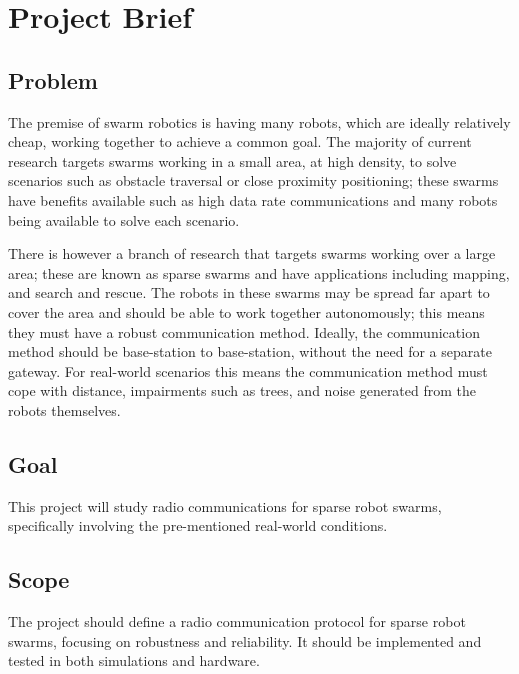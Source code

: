 \chapter{Project Brief}\label{sec:project_brief}
\section*{Problem}
The premise of swarm robotics is having many robots, which are ideally relatively cheap, working together to achieve a common goal. The majority of current research targets swarms working in a small area, at high density, to solve scenarios such as obstacle traversal or close proximity positioning; these swarms have benefits available such as high data rate communications and many robots being available to solve each scenario. 

There is however a branch of research that targets swarms working over a large area; these are known as sparse swarms and have applications including mapping, and search and rescue. The robots in these swarms may be spread far apart to cover the area and should be able to work together autonomously; this means they must have a robust communication method. Ideally, the communication method should be base-station to base-station, without the need for a separate gateway. For real-world scenarios this means the communication method must cope with distance, impairments such as trees, and noise generated from the robots themselves.

\section*{Goal}
This project will study radio communications for sparse robot swarms, specifically involving the pre-mentioned real-world conditions.

\section*{Scope}
The project should define a radio communication protocol for sparse robot swarms, focusing on robustness and reliability. It should be implemented and tested in both simulations and hardware. 
